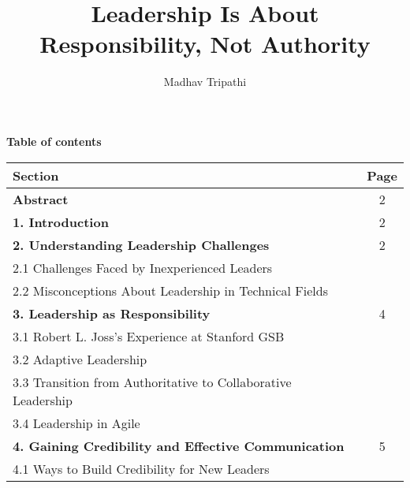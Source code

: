 \documentclass[runningheads]{llncs}
\begin{document}
\title{Leadership Is About Responsibility, Not Authority}

\author{
Madhav Tripathi
}

\maketitle              %

\vspace{10mm}
\begin{center}
\Large\textbf{ Table of contents}\\[1ex]
\end{center}

{\renewcommand{\arraystretch}{1.5} %
\begin{table}[h]
\centering
\begin{tabularx}{\textwidth}{|@{\hspace{2mm}}X|@{\hspace{2mm}}c@{\hspace{2mm}}|}
\hline
\textbf{Section} & \textbf{Page} \\ \hline
\textbf{Abstract} & 2 \\ \hline
\textbf{1. Introduction} & 2 \\ \hline
\textbf{2. Understanding Leadership Challenges} & 2 \\
\hspace{5mm}2.1 Challenges Faced by Inexperienced Leaders & \\
\hspace{5mm}2.2 Misconceptions About Leadership in Technical Fields & \\ \hline
\textbf{3. Leadership as Responsibility} & 4 \\
\hspace{5mm}3.1 Robert L. Joss's Experience at Stanford GSB & \\
\hspace{5mm}3.2 Adaptive Leadership & \\
\hspace{5mm}3.3 Transition from Authoritative to Collaborative Leadership & \\
\hspace{5mm}3.4 Leadership in Agile & \\ \hline
\textbf{4. Gaining Credibility and Effective Communication }& 5 \\
\hspace{5mm}4.1 Ways to Build Credibility for New Leaders & \\

\end{tabularx}
\end{table}}
\end{document}
